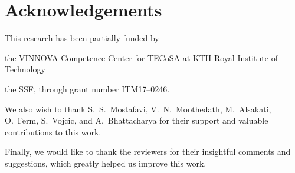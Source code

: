 \section*{Acknowledgements}\label{sec:acks}

This research has been partially funded by
\begin{enumerate*}[itemjoin={{; }}, itemjoin*={{; and }}]
    \item the VINNOVA Competence Center for \gls{TECoSA} at KTH Royal Institute of Technology
    \item the \gls{SSF}, through grant number ITM17--0246.
\end{enumerate*}

We also wish to thank S.~S.~Mostafavi, V.~N.~Moothedath, M.~Alsakati, O.~Ferm, S.~Vojcic, and A.~Bhattacharya for their support and valuable contributions to this work.

Finally, we would like to thank the reviewers for their insightful comments and suggestions, which greatly helped us improve this work.
